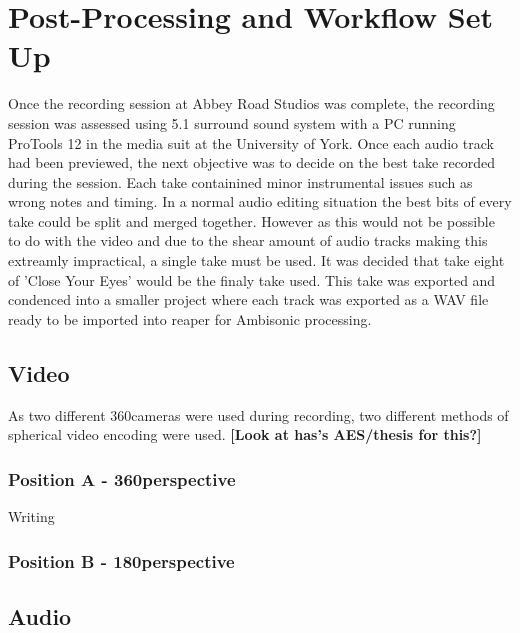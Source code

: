 
















\section{Post-Processing and Workflow Set Up} %

	Once the recording session at Abbey Road Studios was complete, the recording session was assessed using 5.1 surround sound system with a PC running ProTools 12 in the media suit at the University of York. Once each audio track had been previewed, the next objective was to decide on the best take recorded during the session. Each take containined minor instrumental issues such as wrong notes and timing. In a normal audio editing situation the best bits of every take could be split and merged together. However as this would not be possible to do with the video and due to the shear amount of audio tracks making this extreamly impractical, a single take must be used. It was decided that take eight of 'Close Your Eyes' would be the finaly take used. This take was exported and condenced into a smaller project where each track was exported as a WAV file ready to be imported into reaper for Ambisonic processing.

	\subsection{Video}
		As two different 360\textdegree cameras were used during recording, two different methods of spherical video encoding were used. \textbf{[Look at has's AES/thesis for this?]}

			\subsubsection{Position A - 360\textdegree perspective}
				Writing

			\subsubsection{Position B - 180\textdegree perspective}

	\subsection{Audio}


